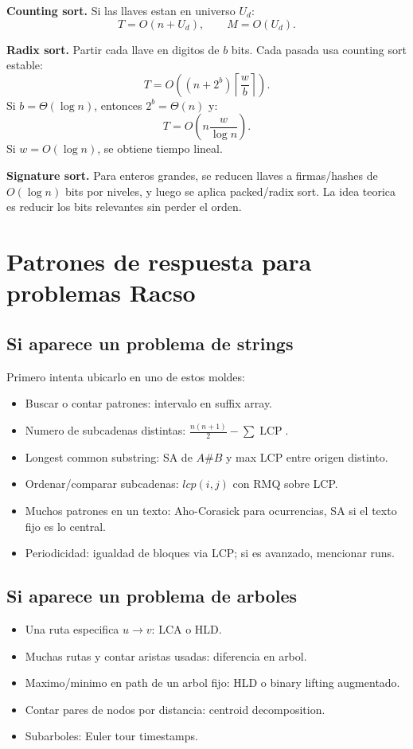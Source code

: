 \documentclass[10pt]{article}
\newcommand{\bigO}{O}
\newcommand{\LCP}{\operatorname{LCP}}
\newcommand{\boxhead}[1]{\vspace{3pt}\textbf{#1.}}
\begin{document}
\boxhead{Counting sort}
Si las llaves estan en universo \(U_d\):
\[
T=\bigO(n+U_d),\qquad M=\bigO(U_d).
\]

\boxhead{Radix sort}
Partir cada llave en digitos de \(b\) bits. Cada pasada usa counting sort estable:
\[
T=\bigO\left((n+2^b)\left\lceil\frac{w}{b}\right\rceil\right).
\]
Si \(b=\Theta(\log n)\), entonces \(2^b=\Theta(n)\) y:
\[
T=\bigO\left(n\frac{w}{\log n}\right).
\]
Si \(w=\bigO(\log n)\), se obtiene tiempo lineal.

\boxhead{Signature sort}
Para enteros grandes, se reducen llaves a firmas/hashes de \(\bigO(\log n)\) bits por niveles, y luego se aplica
packed/radix sort. La idea teorica es reducir los bits relevantes sin perder el orden.

\newpage

\section{Patrones de respuesta para problemas Racso}

\subsection{Si aparece un problema de strings}
Primero intenta ubicarlo en uno de estos moldes:
\begin{itemize}
\item Buscar o contar patrones: intervalo en suffix array.
\item Numero de subcadenas distintas: \(\frac{n(n+1)}2-\sum \LCP\).
\item Longest common substring: SA de \(A\#B\) y max LCP entre origen distinto.
\item Ordenar/comparar subcadenas: \(lcp(i,j)\) con RMQ sobre LCP.
\item Muchos patrones en un texto: Aho-Corasick para ocurrencias, SA si el texto fijo es lo central.
\item Periodicidad: igualdad de bloques via LCP; si es avanzado, mencionar runs.
\end{itemize}

\subsection{Si aparece un problema de arboles}
\begin{itemize}
\item Una ruta especifica \(u\to v\): LCA o HLD.
\item Muchas rutas y contar aristas usadas: diferencia en arbol.
\item Maximo/minimo en path de un arbol fijo: HLD o binary lifting augmentado.
\item Contar pares de nodos por distancia: centroid decomposition.
\item Subarboles: Euler tour timestamps.
\end{itemize}
\end{document}
